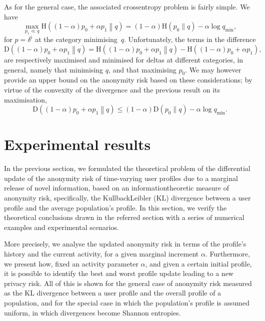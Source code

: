 As for the general case, the associated cross\hyph entropy problem is fairly simple. We have
\begin{equation}\label{eq:H:worst}
\max_{p_1\ll q} \mathrm{H}\left((1-\alpha)p_0+\alpha p_1\middle\|q\right)=(1-\alpha)\mathrm{H}(p_0\|q)-\alpha\log q_\text{min},
\end{equation}
for $p=\delta^i$ at the category minimising~$q$. Unfortunately, the terms in the difference
\begin{equation*}
\mathrm{D}\left((1-\alpha)p_0+\alpha p_1\middle\|q\right)=\mathrm{H}\left((1-\alpha)p_0+\alpha p_1\middle\|q\right)-\mathrm{H}\left((1-\alpha)p_0+\alpha p_1\right),
\end{equation*}
are respectively maximised and minimised for deltas at different categories, in general, namely that minimising $q$, and that maximising $p_0$. We may however provide an upper bound on the anonymity risk based on these considerations; by virtue of the convexity of the divergence and the previous result on its maximisation,
\begin{equation}\label{eq:D:worst}
\mathrm{D}\left((1-\alpha)p_0+\alpha p_1\middle\|q\right)\leqslant(1-\alpha)\mathrm{D}(p_0\|q)-\alpha\log q_\text{min}.
\end{equation}



\section{Experimental results}

\noindent
In the previous section, we formulated the theoretical problem of the differential update of the anonymity risk of time-varying user profiles due to a marginal release of novel information, based on an information\hyph theoretic measure of anonymity risk, specifically, the Kullback\hyph Leibler (KL) divergence between a user profile and the average population's profile. In this section, we verify the theoretical conclusions drawn in the referred section with a series of numerical examples and experimental scenarios. 

More precisely, we analyse the updated anonymity risk in terms of the profile's history and the current activity, for a given marginal increment $\alpha$. Furthermore, we present how, fixed an activity parameter $\alpha$, and given a certain initial profile, it is possible to identify the best and worst profile update leading to a new privacy risk. All of this is shown for the general case of anonymity risk measured as the KL divergence between a user profile and the overall profile of a population, and for the special case in which the population's profile is assumed uniform, in which divergences become Shannon entropies.
 
